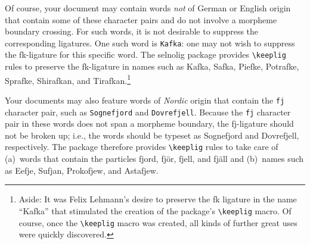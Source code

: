 \documentclass[11pt]{article}
\newcommand{\pkg}[1]{\textsf{#1}}
\newcommand{\opt}[1]{\texttt{#1}}
\newcommand{\cmmd}[1]{\texttt{\textbackslash #1}}
\begin{document}
Of course, your document may contain words \emph{not} of German or English origin that contain some of these character pairs and do not involve a morpheme boundary crossing. For such words, it is not desirable to suppress the corresponding ligatures. One such word is \opt{Kafka}: one may not wish to suppress the {\ebg\mbox{fk}}-ligature for this specific word. The \pkg{selnolig} package provides \cmmd{keeplig} rules to preserve the {\ebg\mbox{fk}}-ligature in names such as {\ebg Kafka, Safka, Piefke, Potrafke, Sprafke, Shirafkan,} and {\ebg Tirafkan}.\footnote{Aside: It was Felix Lehmann's desire to preserve the {\ebg\mbox{fk}} ligature in the name \enquote{{\ebg Kafka}} that stimulated the creation of the package's \cmmd{keeplig} macro. Of course, once the \cmmd{keeplig} macro was created, all kinds of further great uses were quickly discovered.} 

Your documents may also feature words of \emph{Nordic} origin that contain the \opt{fj} character pair, such as \opt{Sognefjord} and \opt{Dovrefjell}. Because the \opt{fj} character pair in these words does not span a morpheme boundary, the {\ebg\mbox{fj}}-ligature should not be broken up; i.e., the words should be typeset as {\ebg Sognefjord and Dovrefjell}, respectively. The package therefore provides \cmmd{keeplig} rules to take care of (a)~words that contain the particles {\ebg fjord, fjör, fjell, and fjäll} and (b)~names such as {\ebg Eefje, Sufjan, Prokofjew, and Astafjew}.
\end{document}
